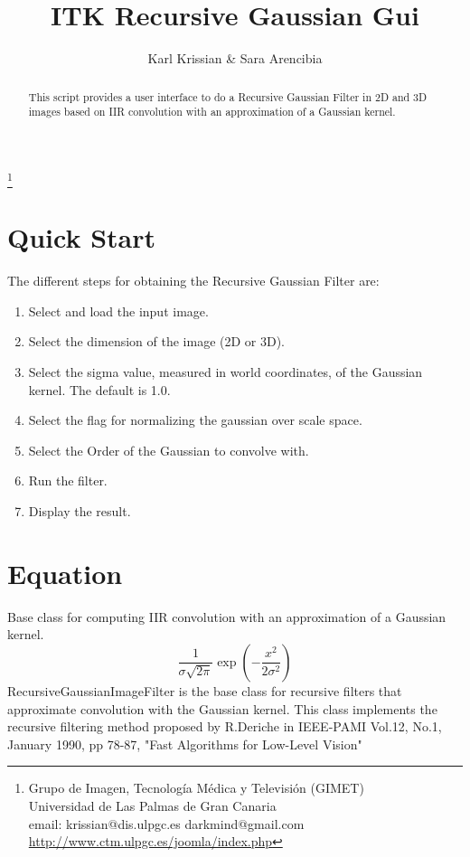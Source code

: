 \documentclass{article}
\begin{document}
\title{ITK Recursive Gaussian Gui}
\author{ Karl Krissian \& Sara Arencibia
}
\thanks{
Grupo de Imagen, Tecnolog\'ia M\'edica y Televisi\'on (GIMET)\\
Universidad de Las Palmas de Gran Canaria\\
email: krissian@dis.ulpgc.es darkmind@gmail.com
\url{http://www.ctm.ulpgc.es/joomla/index.php}
}


\maketitle

\begin{abstract}
This script provides a user interface to do a Recursive Gaussian Filter in 2D and 3D images based on IIR convolution with an approximation of a Gaussian kernel.
\end{abstract}


\section{Quick Start}

The different steps for obtaining the Recursive Gaussian Filter are:
\begin{enumerate}
  \item Select and load the input image.
  \item Select the dimension of the image (2D or 3D).
  \item Select the sigma value, measured in world coordinates, of the Gaussian kernel. The default is 1.0.
  \item Select the flag for normalizing the gaussian over scale space.
  \item Select the Order of the Gaussian to convolve with.
  \item Run the filter.
  \item Display the result.
\end{enumerate}


\section{Equation}
Base class for computing IIR convolution with an approximation of a Gaussian kernel.
\[\frac1{\sigma\sqrt{2\pi}}\exp\left(-\frac{x^2}{2\sigma^2}\right)\]
RecursiveGaussianImageFilter is the base class for recursive filters that approximate convolution with the Gaussian kernel. This class implements the recursive filtering method proposed by R.Deriche in IEEE-PAMI Vol.12, No.1, January 1990, pp 78-87, "Fast Algorithms for Low-Level Vision"
\end{document}
